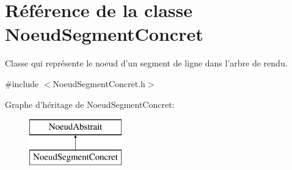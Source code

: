 \hypertarget{class_noeud_segment_concret}{\section{Référence de la classe Noeud\-Segment\-Concret}
\label{class_noeud_segment_concret}
}


Classe qui représente le noeud d'un segment de ligne dans l'arbre de rendu.  




{\ttfamily \#include $<$Noeud\-Segment\-Concret.\-h$>$}

Graphe d'héritage de Noeud\-Segment\-Concret\-:\begin{figure}[H]
\begin{center}
\leavevmode
\includegraphics[height=2.000000cm]{class_noeud_segment_concret}
\end{center}
\end{figure}
